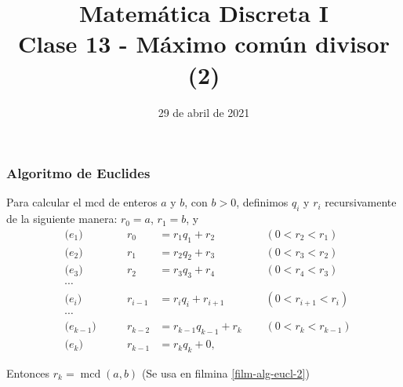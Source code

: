 \documentclass[handout]{beamer} %
\title[Clase 12 - MCD (2)]{Matemática Discreta I \\ Clase 13 - Máximo común divisor (2)}
\institute[]{\normalsize FAMAF / UNC
    \\[\baselineskip] ${}^{}$
    \\[\baselineskip]
}
\date[29/04/2021]{29 de abril  de 2021}
\newcommand{\mcd}{\operatorname{mcd}}
\begin{document}
    
    \frame{\titlepage} 
    
    
    
    \begin{frame}\frametitle{Algoritmo de Euclides}\label{film-alg-eucl}
        Para calcular el mcd de enteros $a$ y $b$, con $b >0$, 
        definimos $q_i$ y $r_i$ recursivamente  de la siguiente manera: $r_0 = a$, $r_1 = b$,  y \pause
        \begin{align*}
            &\text{($e_{1}$)}\qquad& r_0&=r_1 q_1 + r_2& &(0 < r_2<r_1)\\
            &\text{($e_{2}$)}\qquad& r_1&=r_2q_2 + r_3\quad{}\quad{}\quad{}& &(0 < r_3<r_2)  \\
            &\text{($e_{3}$)}\qquad& r_2&=r_3q_3 + r_4\quad{}\quad{}\quad{}& &(0 < r_4<r_3)  \\
            &\cdots&&\\
            &\text{($e_{i}$)}\qquad& r_{i-1}&=r_{i}q_{i} + r_{i+1}& &(0 < r_{i+1} <r_{i}) \\
            &\cdots&& \\
            &\text{($e_{k-1}$)}\qquad& r_{k-2}&=r_{k-1}q_{k-1} + r_{k}& &(0 < r_{k} <r_{k-1}) \\
            &\text{($e_{k}$)}\qquad& r_{k-1}&=r_{k}q_{k} + 0 ,&&  
        \end{align*}\pause
        
        Entonces $r_k = \mcd(a,b)$ {\color{gray} \qquad (Se usa en filmina \ref{film-alg-eucl-2})}
    \end{frame}

    
\end{document}
